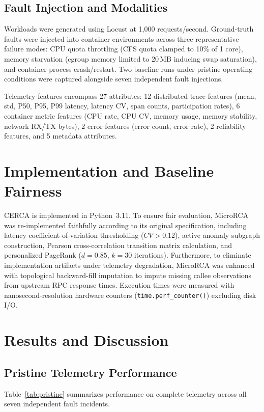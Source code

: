 \documentclass[conference]{IEEEtran}
\begin{document}
\subsection{Fault Injection and Modalities}
Workloads were generated using Locust at 1{,}000 requests/second. Ground-truth faults were injected into container environments across three representative failure modes: CPU quota throttling (CFS quota clamped to 10\% of 1 core), memory starvation (cgroup memory limited to 20\,MB inducing swap saturation), and container process crash/restart. Two baseline runs under pristine operating conditions were captured alongside seven independent fault injections.

Telemetry features encompass 27 attributes: 12 distributed trace features (mean, std, P50, P95, P99 latency, latency CV, span counts, participation rates), 6 container metric features (CPU rate, CPU CV, memory usage, memory stability, network RX/TX bytes), 2 error features (error count, error rate), 2 reliability features, and 5 metadata attributes.

\section{Implementation and Baseline Fairness}

CERCA is implemented in Python~3.11. To ensure fair evaluation, MicroRCA \cite{wu2020} was re-implemented faithfully according to its original specification, including latency coefficient-of-variation thresholding ($CV>0.12$), active anomaly subgraph construction, Pearson cross-correlation transition matrix calculation, and personalized PageRank ($d=0.85$, $k=30$ iterations). Furthermore, to eliminate implementation artifacts under telemetry degradation, MicroRCA was enhanced with topological backward-fill imputation to impute missing callee observations from upstream RPC response times. Execution times were measured with nanosecond-resolution hardware counters (\texttt{time.perf\_counter()}) excluding disk I/O.

\section{Results and Discussion}

\subsection{Pristine Telemetry Performance}
Table~\ref{tab:pristine} summarizes performance on complete telemetry across all seven independent fault incidents.
\end{document}
